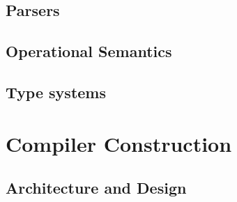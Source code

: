 \subsection{Parsers}

\subsection{Operational Semantics}

\subsection{Type systems}

\section{Compiler Construction}

\subsection{Architecture and Design}
